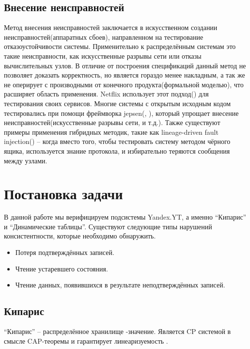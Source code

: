 \documentclass[pdftex,ptm,14pt,a4paper]{extreport}
\theoremstyle{definition}
\begin{document}
\section{Внесение неисправностей}
Метод внесения неисправностей заключается в искусственном создании неисправностей(аппаратных сбоев), направленном на
тестирование отказоустойчивости системы. Применительно к распределённым системам это такие неисправности, как искусственные разрывы сети или
отказы вычислительных узлов. В отличие от построения спецификаций данный метод не позволяет доказать корректность, но является гораздо менее накладным, а так же не оперирует с производными от конечного продукта(формальной моделью), что расширяет область применения.
Netflix использует этот подход(\cite{netflix-simian-army}) для тестирования своих сервисов.
Многие системы с открытым исходным кодом тестировались при помощи фреймворка jepsen(\cite{jepsen-io}, \cite{jepsen-analyses}), который
упрощает внесение неисправностей(искусственные разрывы сети, и т.д.).
Также существуют примеры применения
гибридных методик, такие как lineage-driven fault injection(\cite{molly}) -- когда вместо того, чтобы тестировать
систему методом чёрного ящика, используется знание протокола, и избирательно теряются сообщения между узлами.
\chapter{Постановка задачи}
В данной работе мы верифицируем подсистемы Yandex.YT, а именно “Кипарис” и “Динамические таблицы”.
Существуют следующие типы нарушений консистентности, которые необходимо обнаружить.
\begin{itemize}
    \item Потеря подтверждённых записей.
    \item Чтение устаревшего состояния.
    \item Чтение данных, появившихся в результате неподтверждённых записей.
\end{itemize}

\section{Кипарис}
“Кипарис” -- распределённое хранилище -значение\guillemotright.
Является CP системой в смысле CAP-теоремы и гарантирует линеаризуемость \cite{linearizable}.
\end{document}
